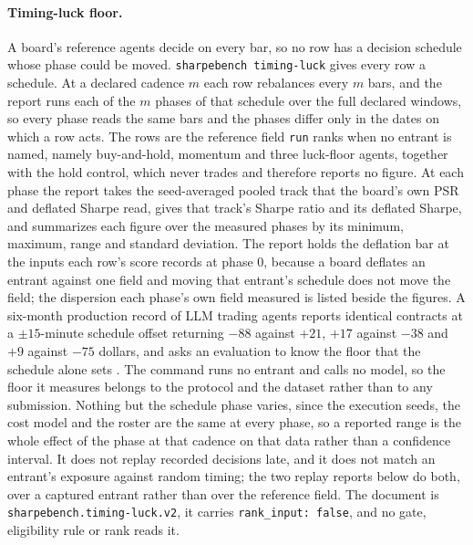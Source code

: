 \paragraph{Timing-luck floor.} A board's reference agents decide on every bar, so no row has a decision schedule whose phase could be moved. \texttt{sharpebench timing-luck} gives every row a schedule. At a declared cadence $m$ each row rebalances every $m$ bars, and the report runs each of the $m$ phases of that schedule over the full declared windows, so every phase reads the same bars and the phases differ only in the dates on which a row acts. The rows are the reference field \texttt{run} ranks when no entrant is named, namely buy-and-hold, momentum and three luck-floor agents, together with the hold control, which never trades and therefore reports no figure. At each phase the report takes the seed-averaged pooled track that the board's own PSR and deflated Sharpe read, gives that track's Sharpe ratio and its deflated Sharpe, and summarizes each figure over the measured phases by its minimum, maximum, range and standard deviation. The report holds the deflation bar at the inputs each row's score records at phase 0, because a board deflates an entrant against one field and moving that entrant's schedule does not move the field; the dispersion each phase's own field measured is listed beside the figures. A six-month production record of LLM trading agents reports identical contracts at a $\pm 15$-minute schedule offset returning $-88$ against $+21$, $+17$ against $-38$ and $+9$ against $-75$ dollars, and asks an evaluation to know the floor that the schedule alone sets \citep[p.~15]{barton2026production}. The command runs no entrant and calls no model, so the floor it measures belongs to the protocol and the dataset rather than to any submission. Nothing but the schedule phase varies, since the execution seeds, the cost model and the roster are the same at every phase, so a reported range is the whole effect of the phase at that cadence on that data rather than a confidence interval. It does not replay recorded decisions late, and it does not match an entrant's exposure against random timing; the two replay reports below do both, over a captured entrant rather than over the reference field. The document is \texttt{sharpebench.timing-luck.v2}, it carries \texttt{rank\_input: false}, and no gate, eligibility rule or rank reads it.

